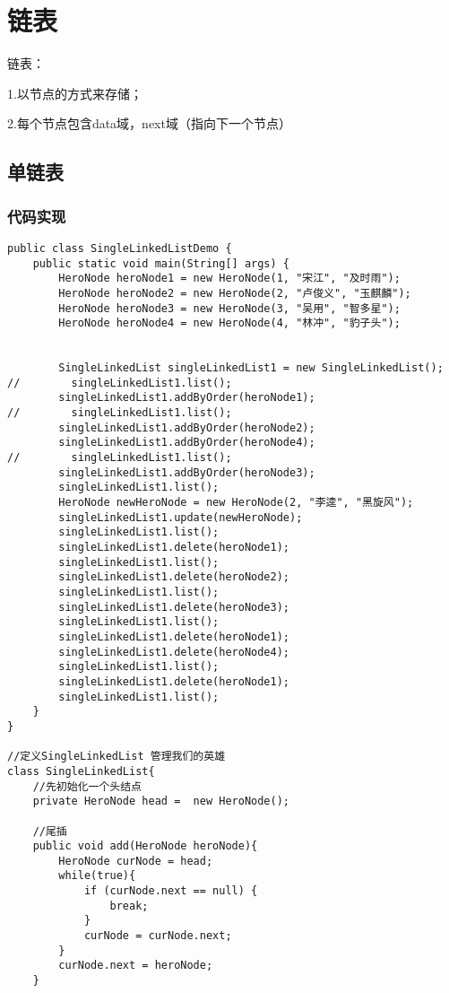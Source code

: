 \documentclass[a4paper]{report}
\begin{document}
\chapter{链表}
链表：

1.以节点的方式来存储；

2.每个节点包含data域，next域（指向下一个节点）

\section{单链表}

\subsection{代码实现}
\begin{lstlisting}
public class SingleLinkedListDemo {
    public static void main(String[] args) {
        HeroNode heroNode1 = new HeroNode(1, "宋江", "及时雨");
        HeroNode heroNode2 = new HeroNode(2, "卢俊义", "玉麒麟");
        HeroNode heroNode3 = new HeroNode(3, "吴用", "智多星");
        HeroNode heroNode4 = new HeroNode(4, "林冲", "豹子头");


        SingleLinkedList singleLinkedList1 = new SingleLinkedList();
//        singleLinkedList1.list();
        singleLinkedList1.addByOrder(heroNode1);
//        singleLinkedList1.list();
        singleLinkedList1.addByOrder(heroNode2);
        singleLinkedList1.addByOrder(heroNode4);
//        singleLinkedList1.list();
        singleLinkedList1.addByOrder(heroNode3);
        singleLinkedList1.list();
        HeroNode newHeroNode = new HeroNode(2, "李逵", "黑旋风");
        singleLinkedList1.update(newHeroNode);
        singleLinkedList1.list();
        singleLinkedList1.delete(heroNode1);
        singleLinkedList1.list();
        singleLinkedList1.delete(heroNode2);
        singleLinkedList1.list();
        singleLinkedList1.delete(heroNode3);
        singleLinkedList1.list();
        singleLinkedList1.delete(heroNode1);
        singleLinkedList1.delete(heroNode4);
        singleLinkedList1.list();
        singleLinkedList1.delete(heroNode1);
        singleLinkedList1.list();
    }
}

//定义SingleLinkedList 管理我们的英雄
class SingleLinkedList{
    //先初始化一个头结点
    private HeroNode head =  new HeroNode();

    //尾插
    public void add(HeroNode heroNode){
        HeroNode curNode = head;
        while(true){
            if (curNode.next == null) {
                break;
            }
            curNode = curNode.next;
        }
        curNode.next = heroNode;
    }


\end{lstlisting}
\end{document}
